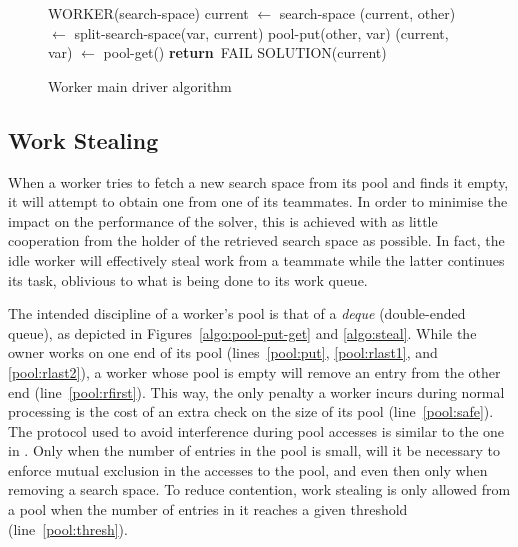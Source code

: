 \documentclass{llncs}
\newcommand{\RETURN}{\textbf{\sffamily return}}
\begin{document}
\begin{figure}[h]
  \sffamily

  \begin{algorithmic}[1]
    \PROC WORKER(search-space)
      \State current $\leftarrow$ search-space
           \label{worker:sel}
        \State (current, other) $\leftarrow$ split-search-space(var, current)
                                                            \label{worker:split}
        \State pool-put(other, var)                         \label{worker:put}
                                                            \label{worker:prop}
          \State (current, var) $\leftarrow$ pool-get()     \label{worker:get}
            \State \RETURN\ FAIL                            \label{worker:fail}
          \EndIf
        \EndWhile
      \EndWhile
      \State \Return SOLUTION(current)                      \label{worker:sol}
    \CORP
  \end{algorithmic}

  \rmfamily
  \caption{Worker main driver algorithm}
  \label{algo:worker}
\end{figure}

\subsection{Work Stealing}
\label{sec:steal}

When a worker tries to fetch a new search space from its pool and
finds it empty, it will attempt to obtain one from one of its
teammates. In order to minimise the impact on the performance of the
solver, this is achieved with as little cooperation from the holder of
the retrieved search space as possible. In fact, the idle worker will
effectively steal work from a teammate while the latter continues its
task, oblivious to what is being done to its work queue.

The intended discipline of a worker's pool is that of a \emph{deque}
(double-ended queue), as depicted in Figures~\ref{algo:pool-put-get}
and \ref{algo:steal}. While the owner works on one end of its pool
(lines~\ref{pool:put}, \ref{pool:rlast1}, and \ref{pool:rlast2}), a
worker whose pool is empty will remove an entry from the other end
(line~\ref{pool:rfirst}). This way, the only penalty a worker incurs
during normal processing is the cost of an extra check on the size of
its pool (line~\ref{pool:safe}). The protocol used to avoid
interference during pool accesses is similar to the one in
\cite{cilk-5}. Only when the number of entries in the pool is small,
will it be necessary to enforce mutual exclusion in the accesses to
the pool, and even then only when removing a search space. To reduce
contention, work stealing is only allowed from a pool when the number
of entries in it reaches a given threshold (line~\ref{pool:thresh}).
\end{document}
